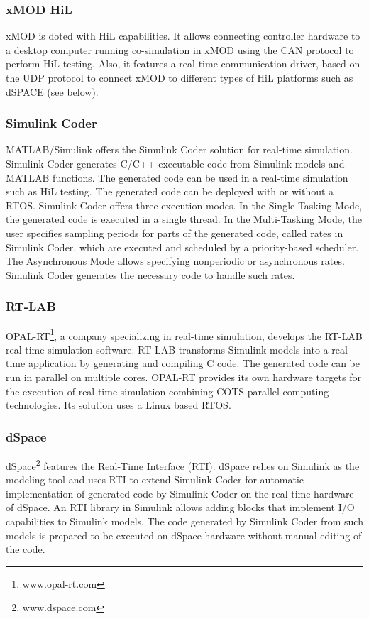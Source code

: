 \subsubsection{xMOD HiL}

xMOD is doted with HiL capabilities. It allows connecting controller hardware to a desktop computer running co-simulation in xMOD using the CAN protocol to perform HiL testing. Also, it features a real-time communication driver, based on the UDP protocol to connect xMOD to different types of HiL platforms such as dSPACE (see below).

\subsubsection{Simulink Coder}

MATLAB/Simulink offers the Simulink Coder solution for real-time simulation. Simulink Coder generates C/C++ executable code from Simulink models and MATLAB functions. The generated code can be used in a real-time simulation such as HiL testing. The generated code can be deployed with or without a RTOS. Simulink Coder offers three execution modes. In the Single-Tasking Mode, the generated code is executed in a single thread. In the Multi-Tasking Mode, the user specifies sampling periods for parts of the generated code, called rates in Simulink Coder, which are executed and scheduled by a priority-based scheduler. The Asynchronous Mode allows specifying nonperiodic or asynchronous rates. Simulink Coder generates the necessary code to handle such rates.

\subsubsection{RT-LAB}

OPAL-RT\footnote{www.opal-rt.com}, a company specializing in real-time simulation, develops the RT-LAB real-time simulation software. RT-LAB transforms Simulink models into a real-time application by generating and compiling C code. The generated code can be run in parallel on multiple cores. OPAL-RT provides its own hardware targets for the execution of real-time simulation combining COTS parallel computing technologies. Its solution uses a Linux based RTOS.

\subsubsection{dSpace}

dSpace\footnote{www.dspace.com} features the Real-Time Interface (RTI). dSpace relies on Simulink as the modeling tool and uses RTI to extend Simulink Coder for automatic implementation of generated code by Simulink Coder on the real-time hardware of dSpace. An RTI library in Simulink allows adding blocks that implement I/O capabilities to Simulink models. The code generated by Simulink Coder from such models is prepared to be executed on dSpace hardware without manual editing of the code.

